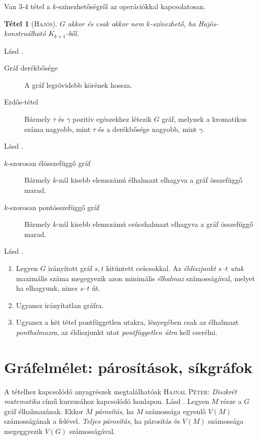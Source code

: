 \documentclass[DIV=15,appendixprefix]{scrreprt}
\newtheorem*{tetel}{Tétel}
\theoremstyle{definition}
\theoremstyle{remark}
\begin{document}
Van 3-4 tétel a $k$-színezhetőségről az operációkkal kapcsolatosan.
\begin{tetel}[\textsc{Hajós}]
	$ G $ akkor és csak akkor nem $k$-színezhető, ha Hajós-konstruálható $K_{k+1}$-ből.
\end{tetel}
%
Lásd
\cite[\href{http://www.math.u-szeged.hu/~hajnal/courses/MSc_Diszkret/MSc_kombi13/ea-girth.pdf}{%
\emph{Gráfok csúcsszínezései II.}}]{DiMat}.
\begin{description}
	\item[Gráf derékbősége] A gráf legrövidebb körének hossza.
	\item[Erdős-tétel] Bármely $ \tau $ és $ \gamma $ pozitív egészekhez létezik $G$ gráf, melynek a
		kromatikus száma nagyobb, mint $ \tau $ és a derékbősége nagyobb, mint $ \gamma $.
\end{description}
%
Lásd
\cite[\href{http://www.math.u-szeged.hu/~hajnal/courses/MSc_Diszkret/MSc_kombi13/ea-folyamok.pdf}{%
\emph{Folyamok II. -- Magasabb fokú összefüggőség}}, 18.~oldaltól]{DiMat}.
\begin{description}
	\item[$ k $-szorosan élösszefüggő gráf] Bármely $k$-nál kisebb elemszámú élhalmazt elhagyva
		a gráf összefüggő marad.
	\item[$ k $-szorosan pontösszefüggő gráf] Bármely $k$-nál kisebb elemszámú csúcshalmazt elhagyva
		a gráf összefüggő marad.
\end{description}
%
Lásd
\cite[\href{http://www.math.u-szeged.hu/~hajnal/courses/MSc_Diszkret/MSc_kombi13/ea-folyamok.pdf}{%
\emph{Folyamok I. -- Alaptételek}}, 13--16.~oldal]{DiMat}.
\begin{enumerate}
	\item Legyen $ G $ irányított gráf $s,{}t$ kitüntett csúcsokkal. Az \emph{éldiszjunkt $s$--$t$
		utak} maximális száma megegyezik azon minimális \emph{élhalmaz} számosságával, melyet ha
		elhagyunk, nincs $s$--$t$ út.
	\item Ugyanez irányítatlan gráfra.
	\item Ugyanez a két tétel pontfüggetlen utakra, lényegében csak az élhalmazt
		\emph{ponthalmazra}, az éldiszjunkt utat \emph{pontfüggetlen útra} kell cserélni.
\end{enumerate}
%
\section{Gráfelmélet: párosítások, síkgráfok}
A tételhez kapcsolódó anyagrészek megtalálhatóak \textsc{Hajnal Péter}: \emph{Diszkrét matematika}
\cite{DiMat} című kurzusához kapcsolódó honlapon.
%
Lásd
\cite[\href{http://www.math.u-szeged.hu/~hajnal/courses/MSc_Diszkret/MSc_kombi13/ea-parositasok.pdf}
{\emph{Párosítások I. -- Alapok, nem kombinatorikus módszerek}}, 1.~szakasz]{DiMat}.
Legyen $ M $ része a $G$ gráf élhalmazának. Ekkor $M$ \emph{párosítás}, ha $M$ számossága egyenlő
$ V \left( M \right) $ számosságának a felével. \emph{Teljes párosítás}, ha párosítás és
$ V \left( M \right) $ számossága megeggyezik $ V \left( G \right) $ számosságával.
\end{document}
